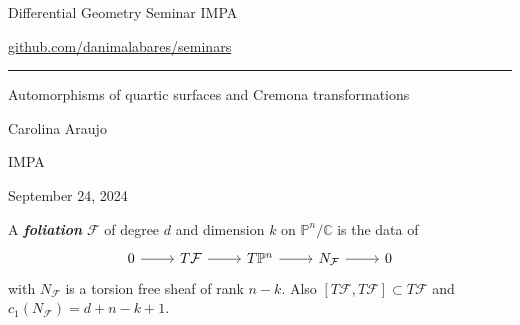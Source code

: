 


\begin{minipage}{\textwidth}
	\begin{minipage}{1\textwidth}
		Differential Geometry Seminar \hfill IMPA
		
		{\small\hfill\href{https://github.com/danimalabares/seminars}{github.com/danimalabares/seminars}}

		
	\end{minipage}
\end{minipage}\vspace{.2cm}\hrule

\vspace{10pt}

{\Huge Automorphisms of quartic surfaces and Cremona transformations}

\hfill{\Large Carolina Araujo}

{\Large \hfill IMPA}

\hfill{\large September 24, 2024}

\tableofcontents

\begin{defn}\leavevmode
	A \textit{\textbf{foliation}}  $\mathcal{F}$ of degree $d$ and dimension $k$ on $\mathbb{P}^n/\mathbb{C}$ is the data of
	\[\begin{tikzcd}0\arrow[r]&T\mathcal{F}\arrow[r]&T\mathbb{P}^n\arrow[r]&N_\mathcal{F}\arrow[r]&0\end{tikzcd}\]
	with $N_\mathcal{F}$ is a torsion free sheaf of rank $n-k$. Also $[T\mathcal{F},T\mathcal{F}] \subset T\mathcal{F}$ and $c_1(N_\mathcal{F})=d+n-k+1$.
\end{defn}



